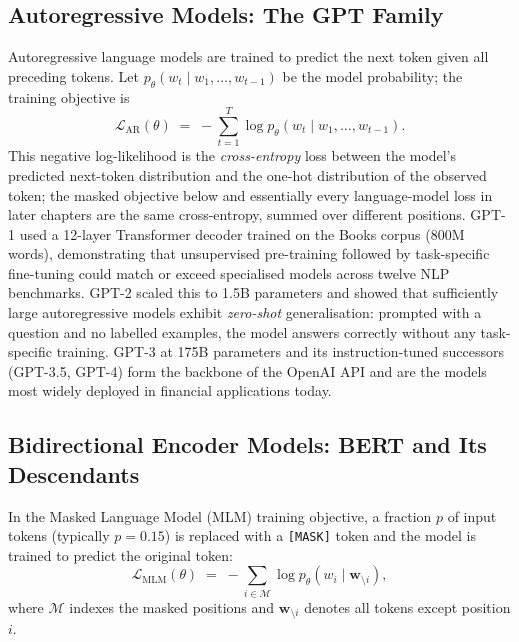 \begin{deepdive}

\subsection{Autoregressive Models: The GPT Family}
\label{sec:llm-gpt}

Autoregressive language models are trained to predict the next token
given all preceding tokens.  Let $p_\theta(w_t \mid w_1, \ldots, w_{t-1})$
be the model probability; the training objective is
\begin{equation}
  \mathcal{L}_{\mathrm{AR}}(\theta)
  \;=\;
  -\sum_{t=1}^{T} \log p_\theta(w_t \mid w_1, \ldots, w_{t-1}).
  \label{eq:ar-objective}
\end{equation}
This negative log-likelihood is the \emph{cross-entropy} loss between the model's
predicted next-token distribution and the one-hot distribution of the observed token;
the masked objective below and essentially every language-model loss in later chapters
are the same cross-entropy, summed over different positions.
GPT-1 \cite{radford2018gpt}
used a 12-layer Transformer decoder trained on the Books corpus
(800M words), demonstrating that unsupervised pre-training followed by
task-specific fine-tuning could match or exceed specialised models across
twelve NLP benchmarks.  GPT-2 \cite{radford2019gpt2}
scaled this to 1.5B parameters and showed that sufficiently large autoregressive
models exhibit \emph{zero-shot} generalisation: prompted with a question and
no labelled examples, the model answers correctly without any task-specific
training.  GPT-3 \cite{brown2020language}
at 175B parameters and its instruction-tuned successors (GPT-3.5, GPT-4)
form the backbone of the OpenAI API and are the models most widely
deployed in financial applications today.

\subsection{Bidirectional Encoder Models: BERT and Its Descendants}
\label{sec:llm-bert}

\begin{definition}
\label{def:mlm-intro}
In the Masked Language Model (MLM) training objective, a fraction $p$
of input tokens (typically $p = 0.15$) is replaced with a \texttt{[MASK]}
token and the model is trained to predict the original token:
\begin{equation}
  \mathcal{L}_{\mathrm{MLM}}(\theta)
  \;=\;
  -\sum_{i \in \mathcal{M}}
  \log p_\theta(w_i \mid \mathbf{w}_{\setminus i}),
  \label{eq:mlm-objective}
\end{equation}
where $\mathcal{M}$ indexes the masked positions and
$\mathbf{w}_{\setminus i}$ denotes all tokens except position $i$.
\end{definition}


\end{deepdive}

